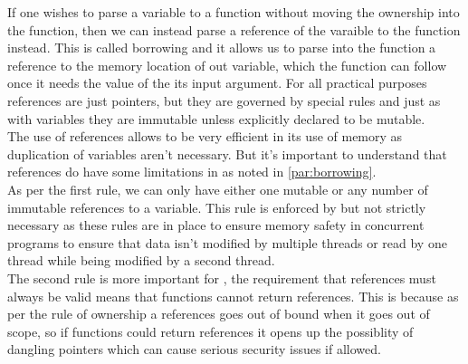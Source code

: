 If one wishes to parse a variable to a function without moving the ownership into the
function, then we can instead parse a reference of the varaible to the function instead. This is
called borrowing and it allows us to parse into the function a reference to the
memory location of out variable, which the function can follow once it needs the value
of the its input argument. For all practical purposes references are just pointers, but they
are governed by special rules and just as with variables they are immutable unless
explicitly declared to be mutable. \\

The use of references allows \lang{} to be very efficient in its use of memory as
duplication of variables aren't necessary. But it's important to understand that
references do have some limitations in \lang{} as noted in \ref{par:borrowing}. \\

As per the first rule, we can only have either one mutable or any number of immutable references to a
variable. This rule is enforced by \lang{} but not strictly necessary as these rules
are in place to ensure memory safety in concurrent programs to ensure that data isn't
modified by multiple threads or read by one thread while being modified by a second
thread. \\

The second rule is more important for \lang{}, the requirement that references must
always be valid means that functions cannot return references. This is because as per
the rule of ownership a references goes out of bound when it goes out of scope, so if
functions could return references it opens up the possiblity of dangling pointers
which can cause serious security issues if allowed.
